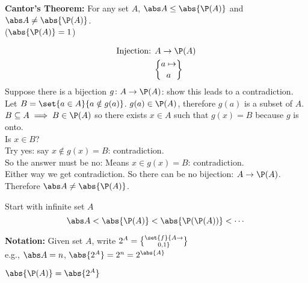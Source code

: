 \textbf{Cantor's Theorem:} For any set $A$, $\abs A\leq\abs{\P(A)}$ and $\abs A\neq\abs{\P(A)}$. \\
($\abs{\P(A)}=1$)

\pf %
\vspace{-\baselineskip}
\begin{align*}
\text{Injection: } & A \to \P(A) \\
& a \mapsto \brace{a}
\end{align*}
Suppose there is a bijection $g\colon A\to\P(A)$: show this leads to a contradiction. \\
Let $B=\set{a\in A}{a\notin g(a)}$.  $g(a)\in\P(A)$, therefore $g(a)$ is a subset of $A$. \\
$B\subseteq A\implies B\in\P(A)$ so there exists $x\in A$ such that $g(x)=B$ because $g$ is onto. \\
Is $x\in B$? \\
Try yes: say $x\notin g(x)=B$: contradiction. \\
So the answer must be no: Means $x\in g(x)=B$: contradiction. \\
Either way we get contradiction.  So there can be no bijection: $A\to\P(A)$. \\
Therefore $\abs A\neq\abs{\P(A)}$.

Start with infinite set $A$
\[ \abs A < \abs{\P(A)} < \abs{\P(\P(A))} < \dotsb \]

\textbf{Notation:} Given set $A$, write $2^A=\set{f}{A\to\brace{0,1}}$ \\
e.g., $\abs A=n$, $\abs{2^A}=2^n=2^{\abs{A}}$

\thm $\abs{\P(A)}=\abs{2^A}$
